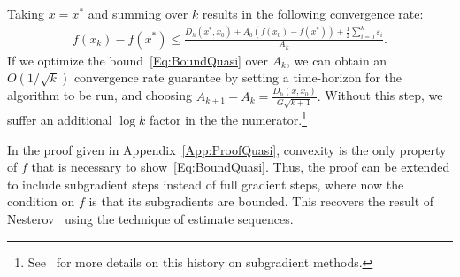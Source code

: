 \documentclass[11pt]{article}
\theoremstyle{plain}
\begin{document}
\noindent Taking $x = x^\ast$ and summing over $k$ results in the following convergence rate:
\begin{align}\label{Eq:BoundQuasi}
f(x_k) - f(x^\ast) \leq \frac{D_h(x^\ast , x_0) +A_0 (f(x_0) - f(x^\ast)) + \frac{1}{2}\sum_{i=0}^{k}\varepsilon_i }{A_k}.
\end{align}
If we optimize the bound~\eqref{Eq:BoundQuasi} over $A_k$, we can obtain an $O(1/\sqrt{k})$ convergence rate guarantee by setting a time-horizon for the algorithm to be run, and choosing $A_{k+1} - A_{k} =\frac{D_h(x,x_0)}{G\sqrt{k+1}}.$ Without this step, we suffer an additional $\log k$ factor in the the numerator.\footnote{See~\cite[2]{Nesterov15} for more details on this history on subgradient methods.}

 In the proof given in Appendix~\ref{App:ProofQuasi}, convexity is the only property of $f$ that is necessary to show~\eqref{Eq:BoundQuasi}. Thus, the proof can be extended to include subgradient steps instead of full gradient steps, where now the condition on $f$ is that its subgradients are  bounded. This recovers the result of Nesterov~\cite{Nesterov15} using the technique of estimate sequences. 
\end{document}
